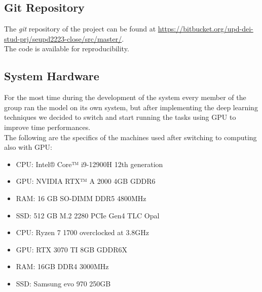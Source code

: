 \newpage
\subsection{Git Repository}
The \textit{git} repository of the project can be found at
\url{https://bitbucket.org/upd-dei-stud-prj/seupd2223-close/src/master/}. \\
The code is available for reproducibility.


\subsection{System Hardware}
For the most time during the development of the system every member of the group ran the model on its own system, but after implementing the deep learning techniques we decided to switch and start running the tasks using GPU to improve time performances. \\
The following are the specifics of the machines used after switching to computing also with GPU:
\begin{itemize}
	\item CPU: Intel® Core™ i9-12900H 12th generation
	\item GPU: NVIDIA RTX™ A 2000 4GB GDDR6
	\item RAM: 16 GB SO-DIMM DDR5 4800MHz
	\item SSD: 512 GB M.2 2280 PCIe Gen4 TLC Opal
\end{itemize}
\begin{itemize}
	\item CPU: Ryzen 7 1700 overclocked at 3.8GHz
	\item GPU: RTX 3070 TI 8GB GDDR6X
	\item RAM: 16GB  DDR4 3000MHz
	\item SSD: Samsung evo 970 250GB
\end{itemize}


